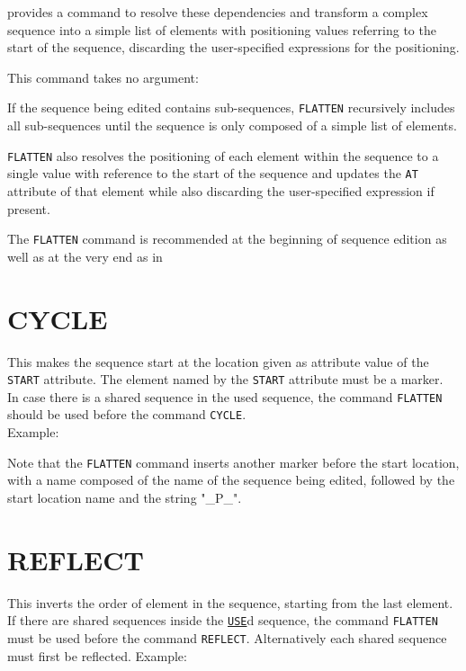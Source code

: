 \madx provides a command to resolve these dependencies and transform a complex
sequence into a simple list of elements with positioning values referring to
the start of the sequence, discarding the user-specified expressions for the
positioning.

This command takes no argument:

If the sequence being edited contains sub-sequences, \texttt{FLATTEN}
recursively includes all sub-sequences until the sequence is only
composed of a simple list of elements.

\texttt{FLATTEN} also resolves the positioning of each element within
the sequence to a single value with reference to the start of the
sequence and updates the \texttt{AT} attribute of that element while
also discarding the user-specified expression if present.

The \texttt{FLATTEN} command is recommended at the beginning of sequence
edition as well as at the very end as in

\section{CYCLE}
\label{sec:cycle}
This makes the sequence start at the location given as attribute value
of the \texttt{START} attribute. The element named by the \texttt{START}
attribute must be a marker. \\
In case there is a shared sequence in the used sequence, the
command \texttt{FLATTEN} should be used before the command
\texttt{CYCLE}. \\
Example:

Note that the \texttt{FLATTEN} command inserts another marker before the
start location, with a name composed of the name of the sequence being
edited, followed by the start location name and the string "\_P\_".

\section{REFLECT}
\label{sec:reflect}
This inverts the order of element in the sequence, starting from the
last element. \\
If there are shared sequences inside the
\hyperref[sec:use]{\texttt{USE}}d sequence,
the command \texttt{FLATTEN} must be used before the command
\texttt{REFLECT}.
Alternatively each shared sequence must first be reflected. Example:


